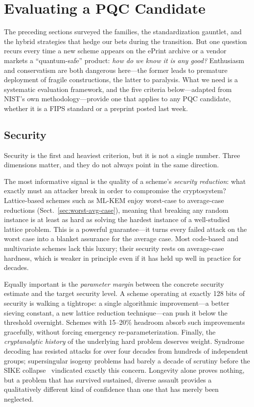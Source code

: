 \section{Evaluating a PQC Candidate}
\label{sec:evaluation-criteria}

The preceding sections surveyed the families, the standardization gauntlet, and the hybrid strategies that hedge our bets during the transition.  But one question recurs every time a new scheme appears on the ePrint archive or a vendor markets a ``quantum-safe'' product: \emph{how do we know it is any good?}  Enthusiasm and conservatism are both dangerous here---the former leads to premature deployment of fragile constructions, the latter to paralysis.  What we need is a systematic evaluation framework, and the five criteria below---adapted from NIST's own methodology---provide one that applies to any PQC candidate, whether it is a FIPS standard or a preprint posted last week.

\subsection{Security}
\label{subsec:eval-security}

Security is the first and heaviest criterion, but it is not a single number.  Three dimensions matter, and they do not always point in the same direction.

The most informative signal is the quality of a scheme's \emph{security reduction}: what exactly must an attacker break in order to compromise the cryptosystem?  Lattice-based schemes such as ML-KEM enjoy worst-case to average-case reductions (Sect.~\ref{sec:worst-avg-case}), meaning that breaking any random instance is at least as hard as solving the hardest instance of a well-studied lattice problem.  This is a powerful guarantee---it turns every failed attack on the worst case into a blanket assurance for the average case.  Most code-based and multivariate schemes lack this luxury; their security rests on average-case hardness, which is weaker in principle even if it has held up well in practice for decades.

Equally important is the \emph{parameter margin} between the concrete security estimate and the target security level.  A scheme operating at exactly 128 bits of security is walking a tightrope: a single algorithmic improvement---a better sieving constant, a new lattice reduction technique---can push it below the threshold overnight.  Schemes with 15--20\% headroom absorb such improvements gracefully, without forcing emergency re-parameterization.  Finally, the \emph{cryptanalytic history} of the underlying hard problem deserves weight.  Syndrome decoding has resisted attacks for over four decades from hundreds of independent groups; supersingular isogeny problems had barely a decade of scrutiny before the SIKE collapse~\cite{CastryckDecru2023} vindicated exactly this concern.  Longevity alone proves nothing, but a problem that has survived sustained, diverse assault provides a qualitatively different kind of confidence than one that has merely been neglected.

